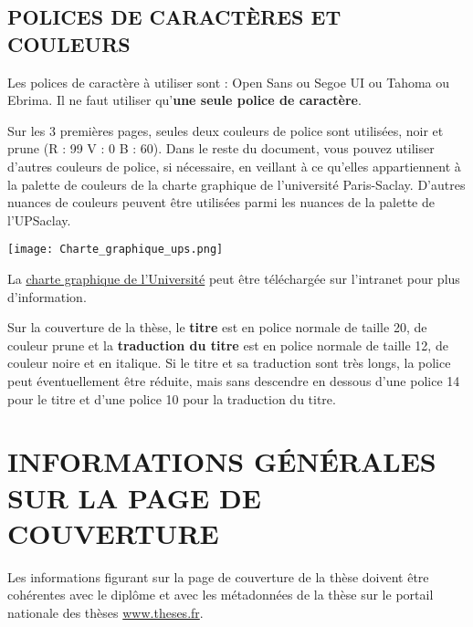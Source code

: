 \documentclass[french,12pt,a4paper]{book}
\begin{document}
\section{POLICES DE CARACTÈRES ET COULEURS}
Les polices de caractère à utiliser sont : Open Sans ou Segoe UI ou Tahoma ou Ebrima. Il ne faut utiliser qu’\textbf{une seule police de caractère}.\\ \par
Sur les 3 premières pages, seules deux couleurs de police sont utilisées, noir et prune (R : 99 V : 0 B : 60). Dans le reste du document, vous pouvez utiliser d’autres couleurs de police, si nécessaire, en veillant à ce qu’elles appartiennent à la palette de couleurs de la charte graphique de l’université Paris-Saclay.  D’autres nuances de couleurs peuvent être utilisées parmi les nuances de la palette de l’UPSaclay.\\ \par

\begin{center} 
\texttt{[image: Charte\_graphique\_ups.png]}
\end{center}

La \href{https://portail.universite-paris-saclay.fr/communication/Pages/Charte-graphique.aspx}{charte graphique de l’Université} peut être téléchargée sur l’intranet pour plus d’information.\\ \par
Sur la couverture de la thèse, le \textbf{titre} est en police normale de taille 20, de couleur prune et la \textbf{traduction du titre} est en police normale de taille 12, de couleur noire et en italique. Si le titre et sa traduction sont très longs, la police peut éventuellement être réduite, mais sans descendre en dessous d’une police 14 pour le titre et d’une police 10 pour la traduction du titre.

\chapter{INFORMATIONS GÉNÉRALES SUR LA PAGE DE COUVERTURE}
Les informations figurant sur la page de couverture de la thèse doivent être cohérentes avec le diplôme et avec les métadonnées de la thèse sur le portail nationale des thèses \url{www.theses.fr}.
\end{document}
